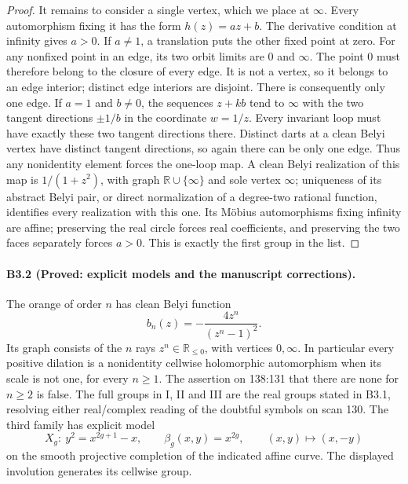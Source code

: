 \begin{proof}
It remains to consider a single vertex, which we place at $\infty$.
Every automorphism fixing it has the form $h(z)=az+b$.
The derivative condition at infinity gives $a>0$. If $a\ne1$, a
translation puts the other fixed point at zero. For any nonfixed
point in an edge, its two orbit limits are $0$ and $\infty$.
The point $0$ must therefore belong to the closure of every edge.
It is not a vertex, so it belongs to an edge interior; distinct
edge interiors are disjoint. There is consequently only one edge.
If $a=1$ and $b\ne0$, the sequences $z+kb$ tend to $\infty$ with
the two tangent directions $\pm1/b$ in the coordinate $w=1/z$.
Every invariant loop must have exactly these two tangent directions
there. Distinct darts at a clean Belyi vertex have distinct tangent
directions, so again there can be only one edge. Thus any nonidentity
element forces the one-loop map. A clean Belyi realization of this
map is $1/(1+z^2)$, with graph $\mathbb R\cup\{\infty\}$ and sole
vertex $\infty$; uniqueness of its abstract Belyi pair, or direct
normalization of a degree-two rational function, identifies every
realization with this one. Its M\"obius automorphisms fixing infinity
are affine; preserving the real circle forces real coefficients,
and preserving the two faces separately forces $a>0$. This is
exactly the first group in the list.
\end{proof}

\paragraph{B3.2 (Proved: explicit models and the manuscript corrections).}
The orange of order $n$ has clean Belyi function
\[
 b_n(z)=-\frac{4z^n}{(z^n-1)^2}.
\]
Its graph consists of the $n$ rays $z^n\in\mathbb R_{\leq0}$,
with vertices $0,\infty$. In particular every positive dilation is
a nonidentity cellwise holomorphic automorphism when its scale is
not one, for every $n\geq1$. The assertion on 138:131 that there
are none for $n\geq2$ is false. The full groups in I, II and III
are the real groups stated in B3.1, resolving either real/complex
reading of the doubtful symbols on scan 130.
The third family has explicit model
\[
 X_g:\ y^2=x^{2g+1}-x,\qquad \beta_g(x,y)=x^{2g},
 \qquad (x,y)\longmapsto(x,-y)
\]
on the smooth projective completion of the indicated affine curve.
The displayed involution generates its cellwise group.

